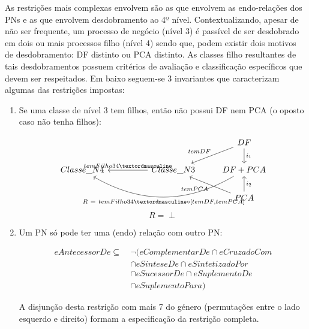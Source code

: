 \documentclass[tikz,runningheads,a4paper]{llncs}
\begin{document}
As restrições mais complexas envolvem são as que envolvem as endo-relações dos PNs e as que envolvem desdobramento ao 4º nível. Contextualizando, apesar de não ser frequente, um processo de negócio (nível 3) é passível de ser desdobrado em dois ou mais processos filho (nível 4) sendo que, podem existir dois motivos de desdobramento: DF distinto ou PCA distinto. As classes filho resultantes de tais desdobramentos possuem critérios de avaliação e classificação específicos que devem ser respeitados. Em baixo seguem-se 3 invariantes que caracterizam algumas das restrições impostas:

\begin{enumerate}
    \item Se uma classe de nível 3 tem filhos, então não possui DF nem PCA (o oposto caso não tenha filhos):
    
    \begin{equation}
    \label{inv-3-4}
    \begin{tikzcd}
               &  &                                       & DF \arrow{d}{i_1} \arrow[swap]{ld}{temDF}   \\
Classe\_N4 &  & Classe\_N3 \arrow[swap]{ll}{temFilho34º} & DF + PCA \arrow[bend left]{lll}{R\ = \ temFilho34º \circ [temDF, temPCA]}       \\
           &  &                                       & PCA \arrow[swap]{u}{i_2} \arrow{lu}{temPCA}
    \end{tikzcd}
    \end{equation}{}
    \begin{equation*}
        R = \perp
    \end{equation*}{}
    
    \item Um PN só pode ter uma (endo) relação com outro PN:
    
    \begin{equation}
    \begin{split}{}
        eAntecessorDe \subseteq\ & \neg (eComplementarDe \cap eCruzadoCom \\
                                & \cap eSinteseDe \cap eSintetizadoPor \\
                                & \cap eSucessorDe \cap eSuplementoDe \\
                                & \cap eSuplementoPara)
    \end{split}{}
    \end{equation}{}
    
    A disjunção desta restrição com mais 7 do género (permutações entre o lado esquerdo e direito) formam a especificação da restrição completa.
    

\end{enumerate}
\end{document}
